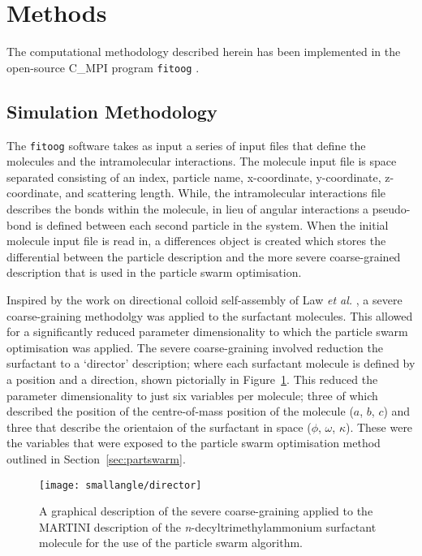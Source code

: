 \section{Methods}

The computational methodology described herein has been implemented in the open-source C\_MPI program \texttt{fitoog} \cite{mccluskey_arm61/fitoog_2019}.

\subsection{Simulation Methodology}

The \texttt{fitoog} software takes as input a series of input files that define the molecules and the intramolecular interactions. 
The molecule input file is space separated consisting of an index, particle name, x-coordinate, y-coordinate, z-coordinate, and scattering length. 
While, the intramolecular interactions file describes the bonds within the molecule, in lieu of angular interactions a pseudo-bond is defined between each second particle in the system. 
When the initial molecule input file is read in, a differences object is created which stores the differential between the particle description and the more severe coarse-grained description that is used in the particle swarm optimisation. 

Inspired by the work on directional colloid self-assembly of Law \emph{et al.} \cite{law_coarse-grained_2016}, a severe coarse-graining methodolgy was applied to the surfactant molecules.
This allowed for a significantly reduced parameter dimensionality to which the particle swarm optimisation was applied. 
The severe coarse-graining involved reduction the surfactant to a `director' description; where each surfactant molecule is defined by a position and a direction, shown pictorially in Figure~\ref{fig:director}.
This reduced the parameter dimensionality to just six variables per molecule; three of which described the position of the centre-of-mass position of the molecule ($a$, $b$, $c$) and three that describe the orientaion of the surfactant in space ($\phi$, $\omega$, $\kappa$).
These were the variables that were exposed to the particle swarm optimisation method outlined in Section~\ref{sec:partswarm}.
%
\begin{figure}
    \centering
    \texttt{[image: smallangle/director]}
    \caption{A graphical description of the severe coarse-graining applied to the MARTINI description of the \emph{n}-decyltrimethylammonium surfactant molecule for the use of the particle swarm algorithm.}
    \label{fig:director}
\end{figure}
%

